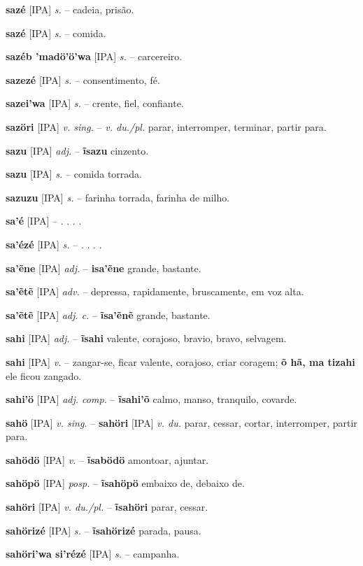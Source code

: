 \textbf{sazé} [IPA] \textit{s.} -- cadeia, prisão.

\textbf{sazé} [IPA] \textit{s.} -- comida.

\textbf{sazéb 'madö'ö'wa} [IPA] \textit{s.} -- carcereiro.

\textbf{sazezé} [IPA] \textit{s.} -- consentimento, fé.

\textbf{sazei'wa} [IPA] \textit{s.} -- crente, fiel, confiante.

\textbf{sazöri} [IPA] \textit{v. sing.} -- \textit{v. du./pl.} parar, interromper, terminar, partir para.

\textbf{sazu} [IPA] \textit{adj.} -- \textbf{ĩsazu} cinzento.

\textbf{sazu} [IPA] \textit{s.} -- comida torrada.

\textbf{sazuzu} [IPA] \textit{s.} -- farinha torrada, farinha de milho.

\textbf{sa'é} [IPA] \textit{} -- . . . .

\textbf{sa'ézé} [IPA] \textit{s.} -- . . . .

\textbf{sa'ẽne} [IPA] \textit{adj.} -- \textbf{isa'ẽne} grande, bastante.

\textbf{sa'ẽtẽ} [IPA] \textit{adv.} -- depressa, rapidamente, bruscamente, em voz alta.

\textbf{sa'ẽtẽ} [IPA] \textit{adj. c.} -- \textbf{ĩsa'ẽnẽ} grande, bastante.

\textbf{sahi} [IPA] \textit{adj.} -- \textbf{ĩsahi} valente, corajoso, bravio, bravo, selvagem.

\textbf{sahi} [IPA] \textit{v.} -- zangar-se, ficar valente, corajoso, criar coragem; \textbf{õ hã, ma tizahi} ele ficou zangado.

\textbf{sahi'ö} [IPA] \textit{adj. comp.} -- \textbf{ĩsahi'õ} calmo, manso, tranquilo, covarde.

\textbf{sahö} [IPA] \textit{v. sing.} -- \textbf{sahöri} [IPA] \textit{v. du.} parar, cessar, cortar, interromper, partir para.

\textbf{sahödö} [IPA] \textit{v.} -- \textbf{ĩsabödö} amontoar, ajuntar.

\textbf{sahöpö} [IPA] \textit{posp.} -- \textbf{ĩsahöpö} embaixo de, debaixo de.

\textbf{sahöri} [IPA] \textit{v. du./pl.} -- \textbf{ĩsahöri} parar, cessar.

\textbf{sahörizé} [IPA] \textit{s.} -- \textbf{ĩsahörizé} parada, pausa.

\textbf{sahöri'wa si'rézé} [IPA] \textit{s.} -- campanha.

